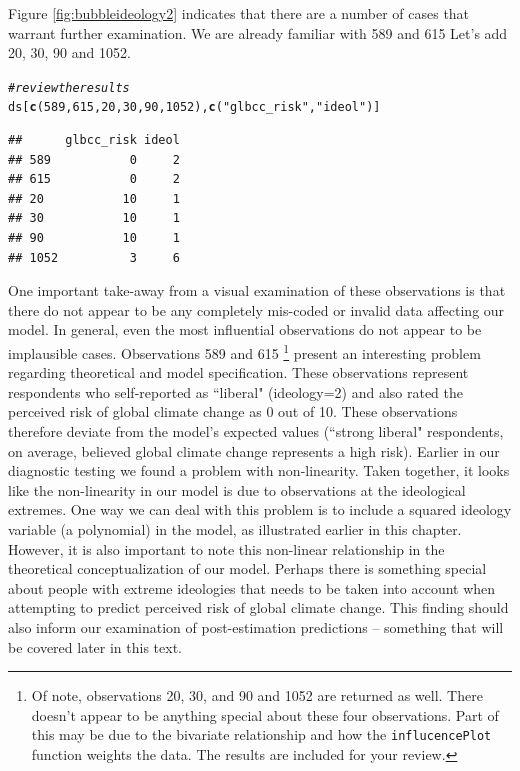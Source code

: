 \documentclass[11pt,openany]{book}\usepackage[]{graphicx}\usepackage[]{color}
\makeatletter
\newcommand{\hlnum}[1]{\textcolor[rgb]{0.686,0.059,0.569}{#1}}%
\newcommand{\hlstr}[1]{\textcolor[rgb]{0.192,0.494,0.8}{#1}}%
\newcommand{\hlcom}[1]{\textcolor[rgb]{0.678,0.584,0.686}{\textit{#1}}}%
\newcommand{\hlstd}[1]{\textcolor[rgb]{0.345,0.345,0.345}{#1}}%
\newcommand{\hlkwd}[1]{\textcolor[rgb]{0.737,0.353,0.396}{\textbf{#1}}}%
\newenvironment{kframe}{%
 \def\at@end@of@kframe{}%
 \ifinner\ifhmode%
  \def\at@end@of@kframe{\end{minipage}}%
  \begin{minipage}{\columnwidth}%
 \fi\fi%
 \def\FrameCommand##1{\hskip\@totalleftmargin \hskip-\fboxsep
 \colorbox{shadecolor}{##1}\hskip-\fboxsep
     \hskip-\linewidth \hskip-\@totalleftmargin \hskip\columnwidth}%
 \MakeFramed {\advance\hsize-\width
   \@totalleftmargin\z@ \linewidth\hsize
   \@setminipage}}%
 {\par\unskip\endMakeFramed%
 \at@end@of@kframe}
\newenvironment{knitrout}{}{} %
\renewenvironment{knitrout}{\begin{singlespace}}{\end{singlespace}}
\makeatother
\begin{document}
\noindent Figure \ref{fig:bubbleideology2} indicates that there are a number of cases that warrant further examination.  We are already familiar with 589 and 615  Let's add 20, 30, 90 and 1052.

\begin{knitrout}
\color{fgcolor}\begin{kframe}
\begin{alltt}
\hlcom{# review the results}
\hlstd{ds[}\hlkwd{c}\hlstd{(}\hlnum{589}\hlstd{,} \hlnum{615}\hlstd{,} \hlnum{20}\hlstd{,} \hlnum{30}\hlstd{,} \hlnum{90}\hlstd{,} \hlnum{1052}\hlstd{),} \hlkwd{c}\hlstd{(}\hlstr{"glbcc_risk"}\hlstd{,} \hlstr{"ideol"}\hlstd{)]}
\end{alltt}
\begin{verbatim}
##      glbcc_risk ideol
## 589           0     2
## 615           0     2
## 20           10     1
## 30           10     1
## 90           10     1
## 1052          3     6
\end{verbatim}
\end{kframe}
\end{knitrout}

One important take-away from a visual examination of these observations is that there do not appear to be any completely mis-coded or invalid data affecting our model. In general, even the most influential observations do not appear to be implausible cases.  Observations 589 and 615 \footnote{Of note, observations 20, 30, and 90 and 1052 are returned as well.  There doesn't appear to be anything special about these four observations.  Part of this may be due to the bivariate relationship and how the \texttt{influcencePlot} function weights the data.  The results are included for your review.} present an interesting problem regarding  theoretical and model specification. These observations represent respondents who self-reported as  ``liberal" (ideology=2) and also rated the perceived risk of global climate change as 0 out of 10. These observations therefore deviate from the model's expected values (``strong liberal" respondents, on average, believed global climate change represents a high risk).  Earlier in our diagnostic testing we found a problem with non-linearity. Taken together, it looks like the non-linearity in our model is due to observations at the ideological extremes.  One way we can deal with this problem is to include a squared ideology variable (a polynomial) in the model, as illustrated earlier in this chapter. However, it is also important to note this non-linear relationship in the theoretical conceptualization of our model. Perhaps there is something special about people with extreme ideologies that needs to be taken into account when attempting to predict perceived risk of global climate change. This finding should also inform our examination of post-estimation predictions -- something that will be covered later in this text.
\end{document}
